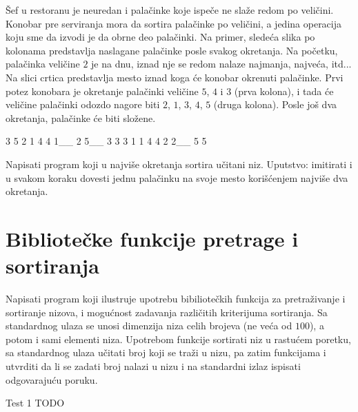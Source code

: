

\begin{Exercise}[difficulty=2, label=516]
  Šef u restoranu je neuredan i palačinke koje ispeče ne slaže redom
  po veličini. Konobar pre serviranja mora da sortira palačinke po
  veličini, a jedina operacija koju sme da izvodi je da obrne deo
  palačinki. Na primer, sledeća slika po kolonama predstavlja
  naslagane palačinke posle svakog okretanja. Na početku, palačinka
  veličine $2$ je na dnu, iznad nje se redom nalaze najmanja, najveća,
  itd... Na slici crtica predstavlja mesto iznad koga će konobar
  okrenuti palačinke. Prvi potez konobara je okretanje palačinki
  veličine $5$, $4$ i $3$ (prva kolona), i tada će veličine palačinki
  odozdo nagore biti $2$, $1$, $3$, $4$, $5$ (druga kolona). Posle još
  dva okretanja, palačinke će biti složene.
\begin{ckod}
    3    5    2    1
    4    4    1__  2
    5__  3    3    3
    1    1    4    4
    2    2__  5    5
\end{ckod}
Napisati program koji u najviše  okretanja sortira učitani
niz. Uputstvo: imitirati  i u svakom koraku
dovesti jednu palačinku na svoje mesto korišćenjem najviše dva
okretanja.
    
\end{Exercise}


\section{Bibliotečke funkcije pretrage i sortiranja}
\begin{Exercise}[label=517]
  Napisati program koji ilustruje upotrebu bibiliotečkih funkcija za
  pretraživanje i sortiranje nizova, i mogućnost zadavanja različitih
  kriterijuma sortiranja. Sa standardnog ulaza se unosi dimenzija niza
  celih brojeva (ne veća od $100$), a potom i sami elementi
  niza. Upotrebom funkcije  sortirati niz u rastućem
  poretku, sa standardnog ulaza učitati broj koji se traži u nizu, pa
  zatim funkcijama  i  utvrditi da li se
  zadati broj nalazi u nizu i na standardni izlaz ispisati
  odgovarajuću poruku.
  
\begin{miditest}
\begin{test}{Test 1}
TODO
\end{test}
\end{miditest}
  
\end{Exercise}

